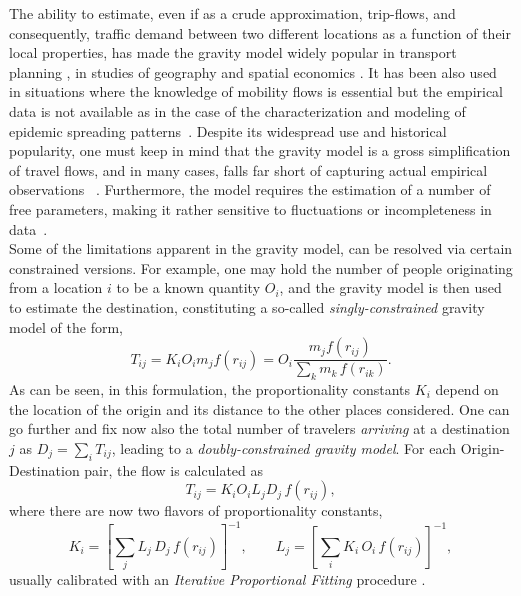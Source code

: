 The ability to estimate, even if as a crude approximation, trip-flows, and consequently, traffic demand between two different locations as a function of their local properties, has made the gravity model widely popular in transport planning \cite{erlander_1990_gravity,ortuzar_2011_modeling}, in studies of geography \cite{wilson_1970_urban} and spatial economics \cite{karemera_2000_gravity,patuelli_2007_network}. It has been also used in situations where the knowledge of mobility flows is essential but the empirical data is not available as in the case of the characterization and modeling of epidemic spreading patterns~\cite{xia_2004_measles,viboud_2006_synchrony,balcan_2009_multiscale,balcan_2010_modeling,li_2011_validation}. 
Despite its widespread use and historical popularity, one must keep in mind that the gravity model is a gross simplification of travel flows, and in many cases, falls far short of capturing actual empirical observations~ \cite{simini_2012_universal,masucci_2013_gravity,lenormand_2015_systematic}.  Furthermore, the model requires the estimation of a number of free parameters, making it rather sensitive to fluctuations or incompleteness in data~\cite{jung_2008_gravity,simini_2012_universal}.\\ 

 Some of the limitations apparent in the gravity model, can be resolved via certain constrained versions. For example, one may hold the number of people originating from a location $i$ to be a known quantity $O_i$, and the gravity model is then used to estimate the destination, constituting a so-called \emph{singly-constrained} gravity model of the form,
%
\begin{equation}
T_{ij} = K_i O_i m_j  f(r_{ij}) =  O_i  \frac{m_j f(r_{ij})}{\sum_k m_k \, f(r_{ik})}.
\label{eq:scgm}
\end{equation}
%
As can be seen, in this formulation, the proportionality constants $K_i$ depend on the location of the origin and its distance to the other places considered.
One can go further and fix now also the total number of travelers \emph{arriving} at a destination $j$ as $D_j = \sum_i T_{ij}$, leading to a {\it doubly-constrained gravity model}. For each Origin-Destination pair, the flow is calculated as
\begin{equation}
T_{ij}= K_i  O_i  L_j D_j \, f(r_{ij}) ,
\label{eq:dcgm}
\end{equation}
where there are now two flavors of proportionality constants,
%
\begin{equation}
K_i =  \left[ \sum_j L_j \, D_j \, f(r_{ij}) \right]^{-1}, \qquad
L_j =  \left[ \sum_i K_i \, O_i \, f(r_{ij}) \right]^{-1}, 
\end{equation}\label{eq:KL}
usually calibrated with an \textit{Iterative Proportional Fitting} procedure \cite{deming_1940_least}. 


